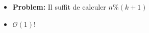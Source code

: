 \begin{frame}
    \frametitle{\problemtitle}
    \begin{itemize}
        \item<+-> \textbf{Problem:} Il suffit de calculer $n \% (k + 1)$
        \item<+-> $\mathcal O(1)$!
    \end{itemize}
\end{frame}
